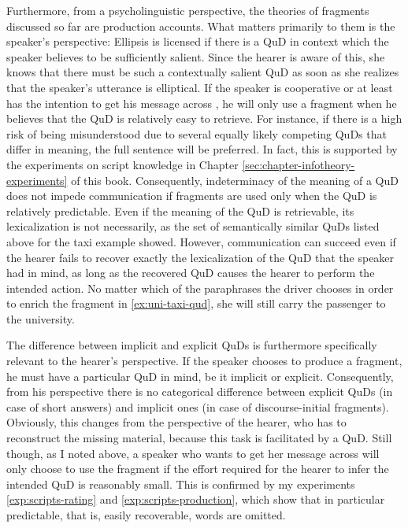 Furthermore, from a psycholinguistic perspective, the theories of fragments discussed so far are production accounts. What matters primarily to them is the speaker's perspective: Ellipsis is licensed if there is a QuD in context which the speaker believes to be sufficiently salient. Since the hearer is aware of this, she knows that there must be such a contextually salient QuD as soon as she realizes that the speaker's utterance is elliptical. If the speaker is cooperative or at least has the intention to get his message across \citep{grice1975, sperber.wilson1995}, he will only use a fragment when he believes that the QuD is relatively easy to retrieve. For instance, if there is a high risk of being misunderstood due to several equally likely competing QuDs that differ in meaning, the full sentence will be preferred. In fact, this is supported by the experiments on script knowledge in Chapter \ref{sec:chapter-infotheory-experiments} of this book. Consequently, indeterminacy of the meaning of a QuD does not impede communication if fragments are used only when the QuD is relatively predictable. Even if the meaning of the QuD is retrievable, its lexicalization is not necessarily, as the set of semantically similar QuDs listed above for the taxi example showed. However, communication can succeed even if the hearer fails to recover exactly the lexicalization of the QuD that the speaker had in mind, as long as the recovered QuD causes the hearer to perform the intended action. No matter which of the paraphrases the driver chooses in order to enrich the fragment in \ref{ex:uni-taxi-qud}, she will still carry the passenger to the university.

The difference between implicit and explicit QuDs is furthermore specifically relevant to the hearer's perspective. If the speaker chooses to produce a fragment, he must have a particular QuD in mind, be it implicit or explicit. Consequently, from his perspective there is no categorical difference between explicit QuDs (in case of short answers) and implicit ones (in case of discourse-initial fragments). Obviously, this changes from the perspective of the hearer, who has to reconstruct the missing material, because this task is  facilitated by a QuD. Still though, as I noted above, a speaker who wants to get her message across will only choose to use the fragment if the effort required for the hearer to infer the intended QuD is reasonably small. This is confirmed by my experiments \ref{exp:scripts-rating} and \ref{exp:scripts-production}, which show that in particular predictable, that is, easily recoverable, words are omitted.

